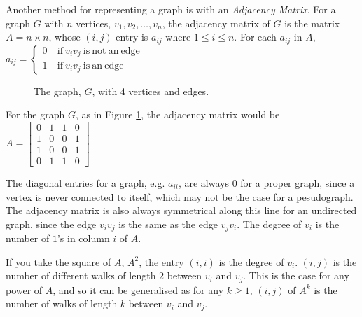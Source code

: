Another method for representing a graph is with an \textit{Adjacency Matrix}. For a graph $G$ with $n$ vertices, $v_1, v_2, \dots, v_n$,
 the adjacency matrix of $G$ is the matrix $A = n \times n$, whose $(i,j)$ entry is $a_{i j}$ where $1 \leq i \leq n$. For
 each $a_{i j}$ in $A$,
 $a_{i j} = \begin{cases}0 & \mathrm{\ if\ } v_iv_j \mathrm{\ is\ not\ an\ edge}\\ 1 & \mathrm{\ if\ } v_iv_j \mathrm{\ is\ an\ edge}\end{cases}$

\begin{minipage}[c]{0.35\linewidth}
  \begin{figure}[H]
    \centering
    \usetikzlibrary{graphs}
    \caption{The graph, $G$, with 4 vertices and edges.}
    \label{fig:adjgraph1}
  \end{figure}
\end{minipage}\hfill
\begin{minipage}[c]{0.55\linewidth}
For the graph $G$, as in Figure \ref*{fig:adjgraph1}, the adjacency matrix would be $A = \begin{bmatrix}
0 & 1 & 1 & 0\\
1 & 0 & 0 & 1\\
1 & 0 & 0 & 1\\
0 & 1 & 1 & 0
\end{bmatrix}$
\end{minipage}

The diagonal entries for a graph, e.g. $a_{i i}$, are always $0$ for a proper graph, since a vertex is never connected
 to itself, which may not be the case for a pesudograph. The adjacency matrix is also always symmetrical along this line
 for an undirected graph, since the edge $v_iv_j$ is the same as the edge $v_jv_i$. The degree of $v_i$ is the number of
 $1$'s in column $i$ of $A$.

If you take the square of $A$, $A^2$, the entry $(i, i)$ is the degree of $v_i$. $(i, j)$ is the number of different
 walks of length $2$ between $v_i$ and $v_j$. This is the case for any power of $A$, and so it can be generalised as
 for any $k \geq 1$, $(i, j)$ of $A^k$ is the number of walks of length $k$ between $v_i$ and $v_j$.